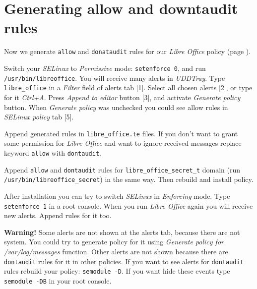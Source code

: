 \section{Generating allow and downtaudit rules}

Now we generate \texttt{allow} and \texttt{donataudit} rules for our
\emph{Libre Office} policy (page \pageref{creating_new_policy}).

Switch your \emph{SELinux} to \emph{Permissive} mode:
\texttt{setenforce 0}, and run \texttt{/usr/bin/libreoffice}. You will
receive many alerts in \emph{UDDTray}. Type \texttt{libre\_office} in a
\emph{Filter} field of alerts tab {[}1{]}. Select all chosen alerts
{[}2{]}, or type for it \emph{Ctrl+A}. Press \emph{Append to editor}
button {[}3{]}, and activate \emph{Generate policy} button. When
\emph{Generate policy} was unchecked you could see allow rules in
\emph{SELinux policy} tab {[}5{]}.



Append generated rules in \texttt{libre\_office.te} files. If you don't
want to grant some permission for \emph{Libre Office} and want to ignore
received messages replace keyword \texttt{allow} with
\texttt{dontaudit}.

Append \texttt{allow} and \texttt{dontaudit} rules for
\texttt{libre\_office\_secret\_t} domain (run
\texttt{/usr/bin/libreoffice\_secret}) in the same way. Then rebuild and
install policy.

After installation you can try to switch \emph{SELinux} in
\emph{Enforcing} mode. Type \texttt{setenforce 1} in a root console.
When you run \emph{Libre Office} again you will receive new alerts.
Append rules for it too.

\textbf{Warning!} Some alerts are not shown at the alerts tab, because
there are not system. You could try to generate policy for it using
\emph{Generate policy for /var/log/messages} function. Other alerts are
not shown because there are \texttt{dontaudit} rules for it in other
policies. If you want to see alerts for \texttt{dontaudit} rules rebuild
your policy: \texttt{semodule -D}. If you want hide these events type
\texttt{semodule -DB} in your root console.

